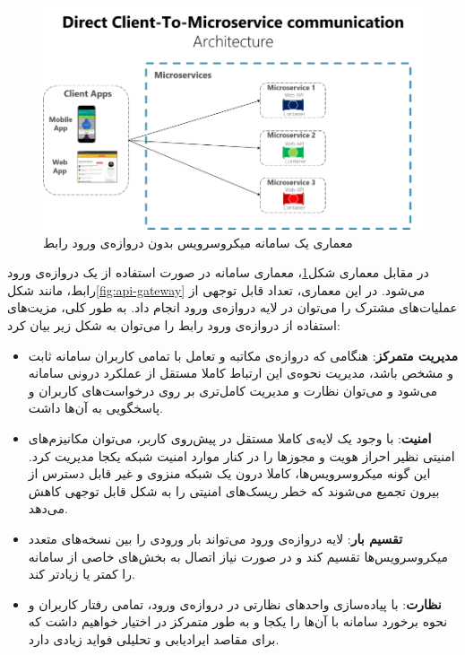 \begin{figure}[h]
	\vspace{1cm}
	\centering
	\includegraphics[scale=1]{figures/direct-client-to-microservice-communication.png}
	\caption{معماری یک سامانه میکروسرویس بدون ‌دروازه‌ی ورود رابط\cite{Microsoft_API_Gateway_2023}}
	\label{fig:no-api-gateway}
\end{figure}

در مقابل معماری شکل\ref{fig:no-api-gateway}، معماری سامانه در صورت استفاده از یک دروازه‌ی ورود رابط، مانند شکل\ref{fig:api-gateway} می‌شود. در این معماری، تعداد قابل توجهی از عملیات‌های مشترک را می‌توان در لایه ‌دروازه‌ی ورود انجام داد. به طور کلی، مزیت‌های استفاده از ‌دروازه‌ی ورود رابط را می‌توان به شکل زیر بیان کرد\cite{Microsoft_API_Gateway_2023}:

\begin{itemize}
	\item \textbf{مدیریت متمرکز}: هنگامی که دروازه‌ی مکاتبه و تعامل با تمامی کاربران سامانه ثابت و مشخص باشد، مدیریت نحوه‌ی این ارتباط کاملا مستقل از عملکرد درونی سامانه می‌شود و می‌توان نظارت و مدیریت کامل‌تری بر روی درخواست‌های کاربران و پاسخگویی به آن‌ها داشت.
	
	\item \textbf{امنیت}: با وجود یک لایه‌ی کاملا مستقل در پیش‌روی کاربر، می‌توان مکانیزم‌های امنیتی نظیر احراز هویت و مجوزها را در کنار موارد امنیت شبکه یکجا مدیریت کرد. این گونه میکروسرویس‌ها، کاملا درون یک شبکه منزوی و غیر قابل دسترس از بیرون تجمیع می‌شوند که خطر ریسک‌های امنیتی را به شکل قابل توجهی کاهش می‌دهد.
	
	\item \textbf{تقسیم بار}: لایه ‌دروازه‌ی ورود می‌تواند بار ورودی را بین نسخه‌های متعدد میکروسرویس‌ها تقسیم کند و در صورت نیاز اتصال به بخش‌های خاصی از سامانه را کمتر یا زیادتر کند.
	
\item \textbf{نظارت}: با پیاده‌سازی واحدهای نظارتی در ‌دروازه‌ی ورود، تمامی رفتار کاربران و نحوه برخورد‌ سامانه با آن‌ها را یکجا و به ‌طور متمرکز در اختیار خواهیم داشت که برای مقاصد ایرادیابی و تحلیلی فواید زیادی دارد.
\end{itemize}

